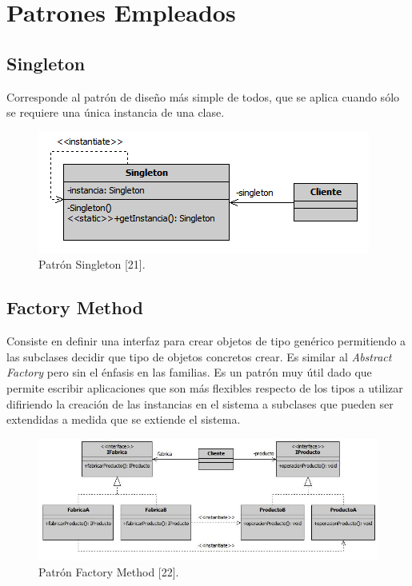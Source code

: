 \section{Patrones Empleados}

\subsection{Singleton}
\label{singleton}       
Corresponde al patrón de diseño más simple de todos, que se aplica cuando sólo se requiere una única instancia de una clase.

\begin{figure}[h!]
	\hspace*{3.5cm} \includegraphics[scale=0.7]{image/singleton.png}
	\caption{Patrón Singleton [21].}	
\end{figure} 

\subsection{Factory Method}
\label{factoryMethod}
Consiste en definir una interfaz para crear objetos de tipo genérico permitiendo a las subclases decidir que tipo de objetos concretos crear. Es similar al \emph{Abstract Factory} pero sin el énfasis en las familias. Es un patrón muy útil dado que permite escribir aplicaciones que son más flexibles respecto de los tipos a utilizar difiriendo la creación de las instancias en el sistema a subclases que pueden ser extendidas a medida que se extiende el sistema. 

\begin{figure}[h!]
	\hspace*{1cm}\includegraphics[scale=0.4]{image/factoryMethod.png}
	\caption{Patrón Factory Method [22].}	
\end{figure} 

